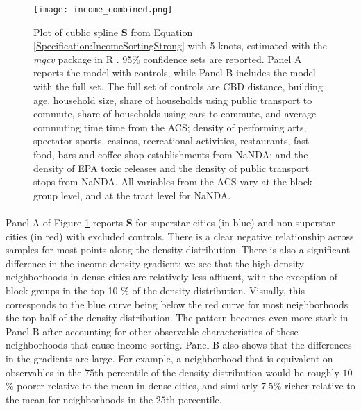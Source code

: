 \documentclass[11pt]{article}
\begin{document}
	\begin{figure}[!ht]
		\begin{center}
			\texttt{[image: income\_combined.png]}
			\caption{Plot of cublic spline $\mathbf{S}$ from Equation \eqref{Specification:IncomeSortingStrong} with 5 knots, estimated with the \textit{mgcv} package in R \citep{gampackage}. 95\% confidence sets are reported. Panel A reports the model with  controls, while Panel B includes the model with the full set. The full set of controls are CBD distance, building age, household size, share of households using public transport to commute, share of households using cars to commute, and average commuting time time from the ACS; density of performing arts, spectator sports, casinos, recreational activities, restaurants, fast food, bars and coffee shop establishments from NaNDA; and the density of EPA toxic releases and the density of public transport stops from NaNDA. All variables from the ACS vary at the block group level, and at the tract level for NaNDA.  }\label{Figure:IncomeSortingStrong}
		\end{center}
	\end{figure}

	\paragraph*{}
	Panel A of Figure \ref{Figure:IncomeSortingStrong} reports $\mathbf{S}$ for superstar cities (in blue) and non-superstar cities (in red) with excluded controls. There is a clear negative relationship across samples for most points along the density distribution. There is also a significant difference in the income-density gradient; we see that the high density neighborhoods in dense cities are relatively less affluent, with the exception of block groups in the top 10 \% of the density distribution. Visually, this corresponds to the blue curve being below the red curve for most neighborhoods the top half of the density distribution. The pattern becomes even more stark in Panel B after accounting for other observable characteristics of these neighborhoods that cause income sorting. Panel B also shows that the differences in the gradients are large. For example, a neighborhood that is equivalent on observables in the $75$th percentile of the density distribution would be roughly $10$\% poorer relative to the mean in dense cities, and similarly $7.5$\% richer relative to the mean for neighborhoods in the $25$th percentile. 
\end{document}
